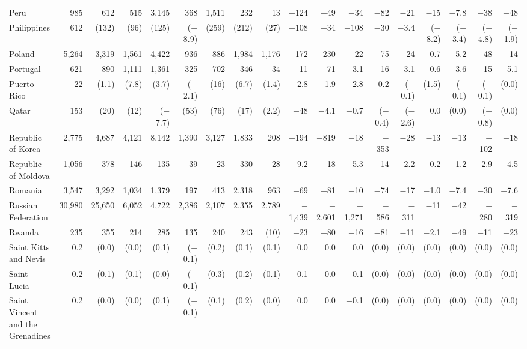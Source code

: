 \begin{longtable}{lrrrrrrrrrrrrrrrrr}
Peru & 985 & 612 & 515 & 3,145 & 368 & 1,511 & 232 & 13 & $-$124 & $-$49 & $-$34 & $-$82 & $-$21 & $-$15 & $-$7.8 & $-$38 & $-$48 \\
Philippines & 612 & (132) & (96) & (125) & ($-$8.9) & (259) & (212) & (27) & $-$108 & $-$34 & $-$108 & $-$30 & $-$3.4 & ($-$8.2) & ($-$3.4) & ($-$4.8) & ($-$1.9) \\
Poland & 5,264 & 3,319 & 1,561 & 4,422 & 936 & 886 & 1,984 & 1,176 & $-$172 & $-$230 & $-$22 & $-$75 & $-$24 & $-$0.7 & $-$5.2 & $-$48 & $-$14 \\
Portugal & 621 & 890 & 1,111 & 1,361 & 325 & 702 & 346 & 34 & $-$11 & $-$71 & $-$3.1 & $-$16 & $-$3.1 & $-$0.6 & $-$3.6 & $-$15 & $-$5.1 \\
Puerto Rico & 22 & (1.1) & (7.8) & (3.7) & ($-$2.1) & (16) & (6.7) & (1.4) & $-$2.8 & $-$1.9 & $-$2.8 & $-$0.2 & ($-$0.1) & (1.5) & ($-$0.1) & ($-$0.1) & (0.0) \\
Qatar & 153 & (20) & (12) & ($-$7.7) & (53) & (76) & (17) & (2.2) & $-$48 & $-$4.1 & $-$0.7 & ($-$0.4) & ($-$2.6) & 0.0 & (0.0) & ($-$0.8) & (0.0) \\
Republic of Korea & 2,775 & 4,687 & 4,121 & 8,142 & 1,390 & 3,127 & 1,833 & 208 & $-$194 & $-$819 & $-$18 & $-$353 & $-$28 & $-$13 & $-$13 & $-$102 & $-$18 \\
Republic of Moldova & 1,056 & 378 & 146 & 135 & 39 & 23 & 330 & 28 & $-$9.2 & $-$18 & $-$5.3 & $-$14 & $-$2.2 & $-$0.2 & $-$1.2 & $-$2.9 & $-$4.5 \\
Romania & 3,547 & 3,292 & 1,034 & 1,379 & 197 & 413 & 2,318 & 963 & $-$69 & $-$81 & $-$10 & $-$74 & $-$17 & $-$1.0 & $-$7.4 & $-$30 & $-$7.6 \\
Russian Federation & 30,980 & 25,650 & 6,052 & 4,722 & 2,386 & 2,107 & 2,355 & 2,789 & $-$1,439 & $-$2,601 & $-$1,271 & $-$586 & $-$311 & $-$11 & $-$42 & $-$280 & $-$319 \\
Rwanda & 235 & 355 & 214 & 285 & 135 & 240 & 243 & (10) & $-$23 & $-$80 & $-$16 & $-$81 & $-$11 & $-$2.1 & $-$49 & $-$11 & $-$23 \\
Saint Kitts and Nevis & 0.2 & (0.0) & (0.0) & (0.1) & ($-$0.1) & (0.2) & (0.1) & (0.1) & 0.0 & 0.0 & 0.0 & (0.0) & (0.0) & (0.0) & (0.0) & (0.0) & (0.0) \\
Saint Lucia & 0.2 & (0.1) & (0.1) & (0.0) & ($-$0.1) & (0.3) & (0.2) & (0.1) & $-$0.1 & 0.0 & $-$0.1 & (0.0) & (0.0) & (0.0) & (0.0) & (0.0) & (0.0) \\
Saint Vincent and the Grenadines & 0.2 & (0.0) & (0.0) & (0.1) & ($-$0.1) & (0.1) & (0.2) & (0.0) & 0.0 & 0.0 & $-$0.1 & (0.0) & (0.0) & (0.0) & (0.0) & (0.0) & (0.0) \\

\end{longtable}
